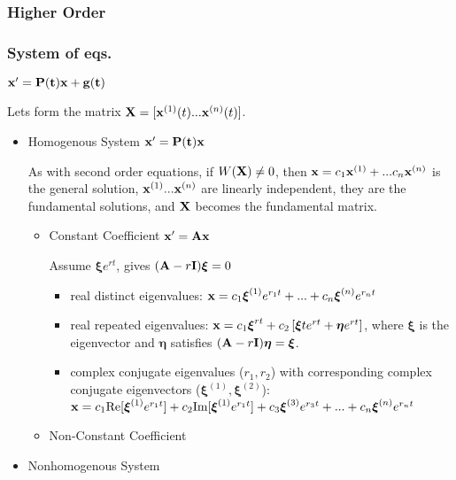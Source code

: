\documentclass[a4paper,12pt]{article}
\begin{document}
	\subsubsection{Higher Order}
	\subsubsection{System of eqs.}
	
	$\bold{x'}=\bold{P(t)}\bold{x}+\bold{g(t)}$
		
	Lets form the matrix $\bold{X}=[\bold{x}^{(1)}(t)...\bold{x}^{(n)}(t)]$.
		
		\begin{itemize}
		\item Homogenous System $\bold{x'}=\bold{P(t)x}$
	
		As with second order equations, if $W(\bold{X})\neq 0$, then $\bold{x}=c_1\bold{x}^{(1)}+...c_n\bold{x}^{(n)}$ is the general solution, $\bold{x}^{(1)}...\bold{x}^{(n)}$ are linearly independent, they are the fundamental solutions, and $\bold{X}$ becomes the fundamental matrix.
			\begin{itemize}
			\item Constant Coefficient $\bold{x'}=\bold{Ax}$
			
			Assume $ \boldsymbol{\xi} e^{rt} $, gives $(\bold{A}-r \bold{I}) \boldsymbol{\xi} = 0$
				\begin{itemize}
				\item real distinct eigenvalues: $\bold{x}=c_1 \boldsymbol{\xi}^{(1)}e^{r_1t}+...+c_n \boldsymbol{\xi}^{(n)} e^{r_nt}$
				\item real repeated eigenvalues: $\bold{x}=c_1\boldsymbol{\xi}^{rt}+c_2\left[ \boldsymbol{\xi} te^{rt}+ \boldsymbol{\eta} e^{rt}\right]$, where $\boldsymbol{\xi}$ is the eigenvector and $\boldsymbol{\eta}$ satisfies $(\bold{A}-r\bold{I}) \boldsymbol{\eta} = \boldsymbol{\xi}$.
				\item complex conjugate eigenvalues ($r_1, r_2$) with corresponding complex conjugate eigenvectors ($\boldsymbol{\xi}^{(1)}, \boldsymbol{\xi}^{(2)}$): \\
				 $\bold{x}=c_1\text{Re}[ \boldsymbol{\xi}^{(1)}e^{r_1t}]+c_2 \text{Im}[ \boldsymbol{\xi}^{(1)}e^{r_1t}]+c_3 \boldsymbol{\xi}^{(3)}e^{r_3t}+...+c_n \boldsymbol{\xi}^{(n)}e^{r_nt}$ 
				\end{itemize}
			\item Non-Constant Coefficient
			\end{itemize}
		\item Nonhomogenous System
		

\end{itemize}
\end{document}
